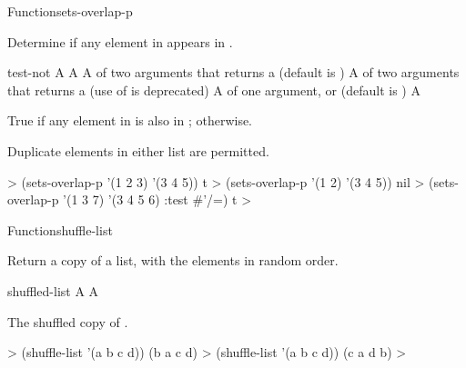 \documentclass[10pt,twoside,english,pdftex]{article}
\begin{document}
\begin{functiondoc}{Function}{sets-overlap-p}{
     
    \returns{} }

\fnsyntax

\fnpurpose Determine if any element in  appears in 
.

\fnpackage {}

\fnmodule {}

\fnargs
\begin{args}{test-not}
\arg[list-1] A 
\arg[list-2] A 
\arg[test] A  of two arguments that returns a
 (default is ) 
 A  of two arguments that returns a
 (use of  is deprecated)
\arg[key] A  of one argument, or \nil{} (default is \nil)
\arg[boolean] A 
\end{args}

\fnreturns True if any element in  is also in
; \nil{} otherwise.

\fndescription Duplicate elements in either list are permitted.

\fnexamples
%
\W\supp
\begin{example}
  > (sets-overlap-p '(1 2 3) '(3 4 5))
  t
  > (sets-overlap-p '(1 2) '(3 4 5))
  nil
  > (sets-overlap-p '(1 3 7) '(3 4 5 6) :test #'/=)
  t
  >
\end{example}

\end{functiondoc}


\begin{functiondoc}{Function}{shuffle-list}{
  \returns{} }
%

\fnsyntax

\fnpurpose Return a copy of a list, with the elements in random order.

\fnpackage {}

\fnmodule {}

\fnargs
\begin{args}{shuffled-list}
\arg[list] A 
 A 
\end{args}

\fnreturns The shuffled copy of .

\fnexamples
%
\W\supp
\begin{example}
  > (shuffle-list '(a b c d))
  (b a c d)
  > (shuffle-list '(a b c d))
  (c a d b)
  >
\end{example}

\end{functiondoc}
\end{document}
